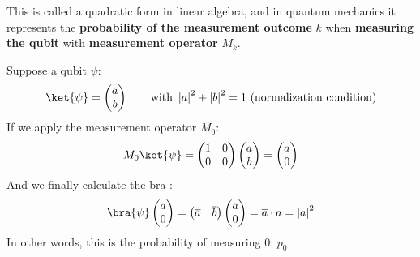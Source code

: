 \begin{remarkbox}
  This is called a quadratic form in linear algebra, and in quantum mechanics it represents the \textbf{probability of the measurement outcome} $k$ when \textbf{measuring the qubit} \ket{\psi} with \textbf{measurement operator} $M_{k}$.

  Suppose a qubit $\psi$:
  \begin{equation*}
    \ket{\psi} = \begin{pmatrix}
      a \\
      b
    \end{pmatrix}
    \hspace{2em}
    \text{with } \left|a\right|^{2} + \left|b\right|^{2} = 1 \text{ (normalization condition)}
  \end{equation*}
  If we apply the measurement operator $M_{0}$:
  \begin{equation*}
    M_{0} \ket{\psi} =
    \begin{pmatrix}
      1 & 0 \\ 0 & 0
    \end{pmatrix}
    \begin{pmatrix}
      a \\ b
    \end{pmatrix}
    =
    \begin{pmatrix}
      a \\ 0
    \end{pmatrix}
  \end{equation*}
  And we finally calculate the bra \bra{\psi}:
  \begin{equation*}
    \bra{\psi} \begin{pmatrix}
      a \\ 0
    \end{pmatrix}
    =
    \begin{pmatrix}
      \overline{a} & \overline{b}
    \end{pmatrix}
    \begin{pmatrix}
      a \\ 0
    \end{pmatrix}
    = \overline{a} \cdot a = \left|a\right|^{2}
  \end{equation*}
  In other words, this is the probability of measuring 0: $p_{0}$.
\end{remarkbox}


